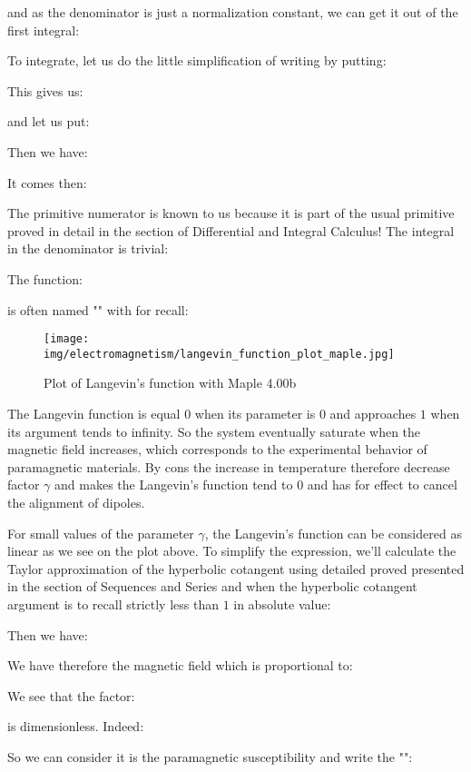 	and as the denominator is just a normalization constant, we can get it out of the first integral:
	
	To integrate, let us do the little simplification of writing by putting:
	
	This gives us:
	
	and let us put:
	
	Then we have:
	
	It comes then:
	
	The primitive numerator is known to us because it is part of the usual primitive proved in detail in the section of Differential and Integral Calculus! The integral in the denominator is trivial:
	
	The function:
	
	is often named "" with for recall:
	
	\begin{figure}[H]
		\centering
		\texttt{[image: img/electromagnetism/langevin\_function\_plot\_maple.jpg]}
		\caption[]{Plot of Langevin's function with Maple 4.00b}
	\end{figure}
	The Langevin function is equal $0$ when its parameter is $0$ and approaches $1$ when its argument tends to infinity. So the system eventually saturate when the magnetic field increases, which corresponds to the experimental behavior of paramagnetic materials. By cons the increase in temperature therefore decrease factor $\gamma$ and makes the Langevin's function tend to $0$ and has for effect to cancel the alignment of dipoles.

	For small values of the parameter $\gamma$, the Langevin's function can be considered as linear as we see on the plot above.
	To simplify the expression, we'll calculate the Taylor approximation of the hyperbolic cotangent using detailed proved presented in the section of Sequences and Series and when the hyperbolic cotangent argument is to recall strictly less than $1$ in absolute value:
	
	Then we have:
	
	We have therefore the magnetic field which is proportional to:
	
	We see that the factor:
	
	is dimensionless. Indeed:
	
	So we can consider it is the paramagnetic susceptibility and write the "":
	
